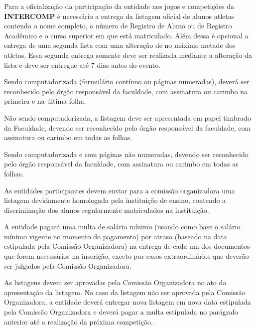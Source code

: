 \begin{article}
    \label{art:listagemoficial}
	Para a oficialização da participação da entidade nos jogos e competições da \textbf{INTERCOMP} é necessário a entrega da listagem oficial de alunos atletas contendo o nome completo, o número de Registro de Aluno ou de Registro Acadêmico e o curso superior em que está matriculado. Além dessa é opcional a entrega de uma segunda lista com uma alteração de no máximo metade dos atletas. Essa segunda entrega somente deve ser realizada mediante a alteração da lista e deve ser entregue até 7 dias antes do evento.

	\begin{xparagraph}
		Sendo computadorizada (formulário contínuo ou páginas numeradas), deverá ser reconhecido pelo órgão responsável da faculdade, com assinatura ou carimbo na primeira e na última folha.
	\end{xparagraph}

	\begin{xparagraph}
		Não sendo computadorizada, a listagem deve ser apresentada em papel timbrado da Faculdade, devendo ser reconhecido pelo órgão responsável da faculdade, com assinatura ou carimbo em todas as folhas.
	\end{xparagraph}

	\begin{xparagraph}
		Sendo computadorizada e com páginas não numeradas, devendo ser reconhecido pelo órgão responsável da faculdade, com assinatura ou carimbo em todas as folhas.
	\end{xparagraph}

	\begin{xparagraph}
    	As entidades participantes devem enviar para a comissão organizadora uma listagem devidamente homologada pela instituição de ensino, contendo a discriminação dos alunos regularmente matriculados na instituição.
	\end{xparagraph}

	\begin{xparagraph}
	    A entidade pagará uma multa de  salário mínimo (usando como base o salário mínimo vigente no momento do pagamento) por atraso (baseado na data estipulada pela Comissão Organizadora) na entrega de cada um dos documentos que forem necessários na inscrição, exceto por casos extraordinários que deverão ser julgados pela Comissão Organizadora.
	\end{xparagraph}

	\begin{xparagraph}
	    As listagens devem ser aprovadas pela Comissão Organizadora no ato da apresentação da listagem. No caso da listagem não ser aprovada pela Comissão Organizadora, a entidade deverá entregar nova listagem em nova data estipulada pela Comissão Organizadora e deverá pagar a multa estipulada no parágrafo anterior até a realização da próxima competição.
	\end{xparagraph}


\end{article}
